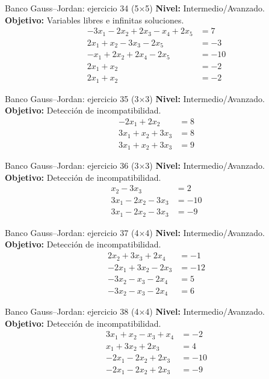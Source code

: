 \documentclass[aspectratio=169,9pt]{beamer}
\theoremstyle{remark}
\begin{document}
\begin{frame}[t]{Banco Gauss--Jordan: ejercicio 34 (5$\times$5)}
\textbf{Nivel:} Intermedio/Avanzado.\\
\textbf{Objetivo:} Variables libres e infinitas soluciones.
\[
\begin{aligned}
- 3 x_{1} - 2 x_{2} + 2 x_{3} - x_{4} + 2 x_{5} &= 7\\
2 x_{1} + x_{2} - 3 x_{3} - 2 x_{5} &= -3\\
- x_{1} + 2 x_{2} + 2 x_{4} - 2 x_{5} &= -10\\
2 x_{1} + x_{2} &= -2\\
2 x_{1} + x_{2} &= -2
\end{aligned}
\]
\end{frame}
\begin{frame}[t]{Banco Gauss--Jordan: ejercicio 35 (3$\times$3)}
\textbf{Nivel:} Intermedio/Avanzado.\\
\textbf{Objetivo:} Detección de incompatibilidad.
\[
\begin{aligned}
- 2 x_{1} + 2 x_{2} &= 8\\
3 x_{1} + x_{2} + 3 x_{3} &= 8\\
3 x_{1} + x_{2} + 3 x_{3} &= 9
\end{aligned}
\]
\end{frame}
\begin{frame}[t]{Banco Gauss--Jordan: ejercicio 36 (3$\times$3)}
\textbf{Nivel:} Intermedio/Avanzado.\\
\textbf{Objetivo:} Detección de incompatibilidad.
\[
\begin{aligned}
x_{2} - 3 x_{3} &= 2\\
3 x_{1} - 2 x_{2} - 3 x_{3} &= -10\\
3 x_{1} - 2 x_{2} - 3 x_{3} &= -9
\end{aligned}
\]
\end{frame}
\begin{frame}[t]{Banco Gauss--Jordan: ejercicio 37 (4$\times$4)}
\textbf{Nivel:} Intermedio/Avanzado.\\
\textbf{Objetivo:} Detección de incompatibilidad.
\[
\begin{aligned}
2 x_{2} + 3 x_{3} + 2 x_{4} &= -1\\
- 2 x_{1} + 3 x_{2} - 2 x_{3} &= -12\\
- 3 x_{2} - x_{3} - 2 x_{4} &= 5\\
- 3 x_{2} - x_{3} - 2 x_{4} &= 6
\end{aligned}
\]
\end{frame}
\begin{frame}[t]{Banco Gauss--Jordan: ejercicio 38 (4$\times$4)}
\textbf{Nivel:} Intermedio/Avanzado.\\
\textbf{Objetivo:} Detección de incompatibilidad.
\[
\begin{aligned}
3 x_{1} + x_{2} - x_{3} + x_{4} &= -2\\
x_{1} + 3 x_{2} + 2 x_{3} &= 4\\
- 2 x_{1} - 2 x_{2} + 2 x_{3} &= -10\\
- 2 x_{1} - 2 x_{2} + 2 x_{3} &= -9
\end{aligned}
\]
\end{frame}
\end{document}
